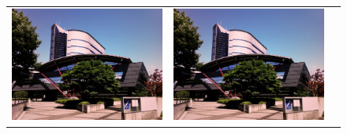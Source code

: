 \documentclass[a4paper]{jsarticle}
\begin{document}
\begin{figure}[tb]
  \begin{center}
    \begin{tabular}{ccc}

    \begin{minipage}{0.3\hsize}
	\includegraphics[width=\hsize]{./images/sample.jpg}
    \end{minipage}
    &
    \begin{minipage}{0.3\hsize}
      \includegraphics[width=\hsize]{./images/sample.jpg}
    \end{minipage}
    &
    \begin{minipage}{0.3\hsize}

\end{minipage}
\end{tabular}
\end{center}
\end{figure}
\end{document}
